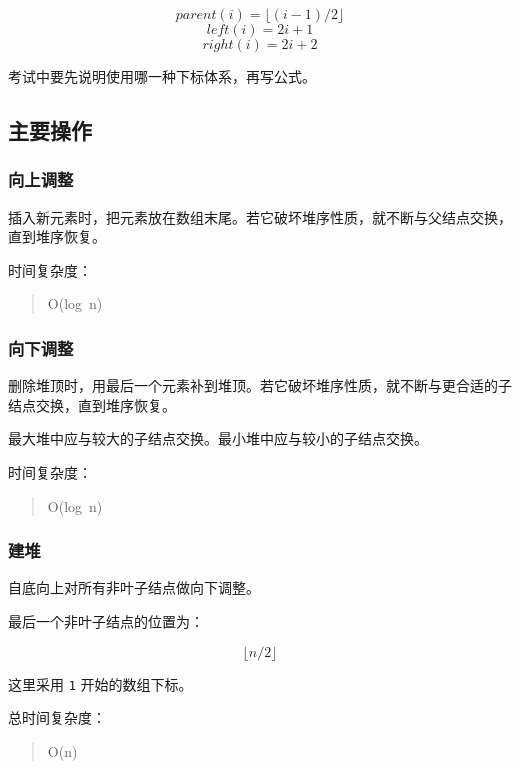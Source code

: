 \documentclass[UTF8,zihao=-4]{ctexart}
\begin{document}
\[parent(i) = \lfloor (i - 1) / 2 \rfloor\]
\[left(i) = 2i + 1\]
\[right(i) = 2i + 2\]

考试中要先说明使用哪一种下标体系，再写公式。

\subsection*{主要操作}

\subsubsection*{向上调整}

插入新元素时，把元素放在数组末尾。若它破坏堆序性质，就不断与父结点交换，直到堆序恢复。

时间复杂度：

\begin{quote}
\small\ttfamily\raggedright
\relax O(log\ n)\\
\end{quote}

\subsubsection*{向下调整}

删除堆顶时，用最后一个元素补到堆顶。若它破坏堆序性质，就不断与更合适的子结点交换，直到堆序恢复。

最大堆中应与较大的子结点交换。最小堆中应与较小的子结点交换。

时间复杂度：

\begin{quote}
\small\ttfamily\raggedright
\relax O(log\ n)\\
\end{quote}

\subsubsection*{建堆}

自底向上对所有非叶子结点做向下调整。

最后一个非叶子结点的位置为：

\[\lfloor n / 2 \rfloor\]

这里采用 \texttt{1} 开始的数组下标。

总时间复杂度：

\begin{quote}
\small\ttfamily\raggedright
\relax O(n)\\
\end{quote}
\end{document}
